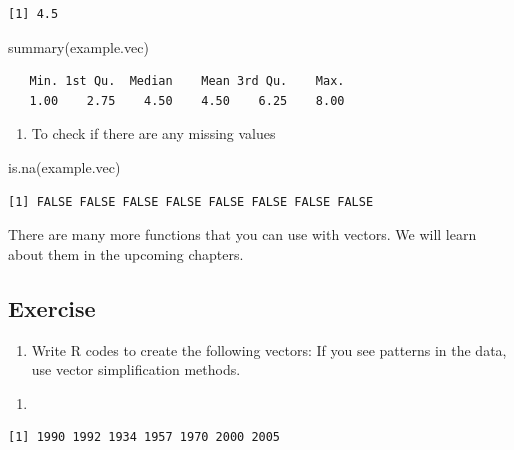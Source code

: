 \documentclass[
  letterpaper,
  DIV=11,
  numbers=noendperiod]{scrreprt}
\newenvironment{Shaded}{\begin{snugshade}}{\end{snugshade}}
\newcommand{\FunctionTok}[1]{\textcolor[rgb]{0.28,0.35,0.67}{#1}}
\newcommand{\NormalTok}[1]{\textcolor[rgb]{0.00,0.23,0.31}{#1}}
\providecommand{\tightlist}{%
  \setlength{\itemsep}{0pt}\setlength{\parskip}{0pt}}\usepackage{longtable,booktabs,array}
\begin{document}
\begin{verbatim}
[1] 4.5
\end{verbatim}

\begin{Shaded}
\begin{Highlighting}[]
\FunctionTok{summary}\NormalTok{(example.vec)}
\end{Highlighting}
\end{Shaded}

\begin{verbatim}
   Min. 1st Qu.  Median    Mean 3rd Qu.    Max. 
   1.00    2.75    4.50    4.50    6.25    8.00 
\end{verbatim}

\begin{enumerate}
\def\labelenumi{\arabic{enumi}.}
\setcounter{enumi}{4}
\tightlist
\item
  To check if there are any missing values
\end{enumerate}

\begin{Shaded}
\begin{Highlighting}[]
\FunctionTok{is.na}\NormalTok{(example.vec)}
\end{Highlighting}
\end{Shaded}

\begin{verbatim}
[1] FALSE FALSE FALSE FALSE FALSE FALSE FALSE FALSE
\end{verbatim}

There are many more functions that you can use with vectors. We will
learn about them in the upcoming chapters.

\subsection{Exercise}\label{exercise-1}

\begin{enumerate}
\def\labelenumi{\arabic{enumi}.}
\tightlist
\item
  Write R codes to create the following vectors: If you see patterns in
  the data, use vector simplification methods.
\end{enumerate}

\begin{enumerate}
\def\labelenumi{\roman{enumi}.}
\tightlist
\item
\end{enumerate}

\begin{verbatim}
[1] 1990 1992 1934 1957 1970 2000 2005
\end{verbatim}
\end{document}
